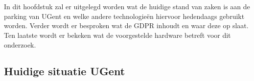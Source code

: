 \chapter{}
\label{ch:stand-van-zaken}






In dit hoofdstuk zal er uitgelegd worden wat de huidige stand van zaken is aan de parking van UGent en welke andere technologieën hiervoor hedendaags gebruikt worden.
Verder wordt er besproken wat de GDPR inhoudt en waar deze op slaat. Ten laatste wordt er bekeken wat de voorgestelde hardware betreft voor dit onderzoek.

\section{Huidige situatie UGent}

